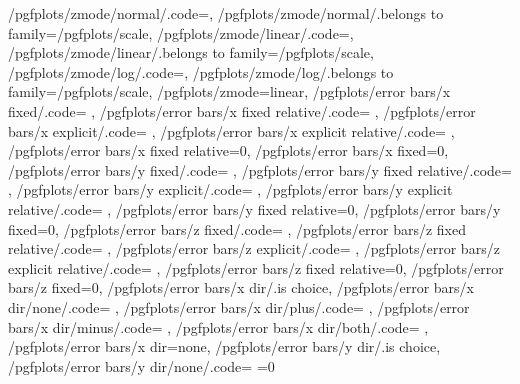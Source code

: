 {	/pgfplots/zmode/normal/.code={\pgfplots@zislineartrue},
	/pgfplots/zmode/normal/.belongs to family=/pgfplots/scale,
	/pgfplots/zmode/linear/.code={\pgfplots@zislineartrue},
	/pgfplots/zmode/linear/.belongs to family=/pgfplots/scale,
	/pgfplots/zmode/log/.code={\pgfplots@zislinearfalse},
	/pgfplots/zmode/log/.belongs to family=/pgfplots/scale,
	/pgfplots/zmode=linear,
	/pgfplots/error bars/x fixed/.code=				\def\pgfplots@errorbars@xfixed{#1}\def\pgfplots@errorbars@xmode{0},
	/pgfplots/error bars/x fixed relative/.code=		\def\pgfplots@errorbars@xrel{#1}\def\pgfplots@errorbars@xmode{1},
	/pgfplots/error bars/x explicit/.code=			\def\pgfplots@errorbars@xmode{2},
	/pgfplots/error bars/x explicit relative/.code=	\def\pgfplots@errorbars@xmode{3},
	/pgfplots/error bars/x fixed relative=0,
	/pgfplots/error bars/x fixed=0,
	/pgfplots/error bars/y fixed/.code=				\def\pgfplots@errorbars@yfixed{#1}\def\pgfplots@errorbars@ymode{0},
	/pgfplots/error bars/y fixed relative/.code=		\def\pgfplots@errorbars@yrel{#1}\def\pgfplots@errorbars@ymode{1},
	/pgfplots/error bars/y explicit/.code=			\def\pgfplots@errorbars@ymode{2},
	/pgfplots/error bars/y explicit relative/.code=	\def\pgfplots@errorbars@ymode{3},
	/pgfplots/error bars/y fixed relative=0,
	/pgfplots/error bars/y fixed=0,
	/pgfplots/error bars/z fixed/.code=				\def\pgfplots@errorbars@zfixed{#1}\def\pgfplots@errorbars@zmode{0},
	/pgfplots/error bars/z fixed relative/.code=		\def\pgfplots@errorbars@zrel{#1}\def\pgfplots@errorbars@zmode{1},
	/pgfplots/error bars/z explicit/.code=			\def\pgfplots@errorbars@zmode{2},
	/pgfplots/error bars/z explicit relative/.code=	\def\pgfplots@errorbars@zmode{3},
	/pgfplots/error bars/z fixed relative=0,
	/pgfplots/error bars/z fixed=0,
	/pgfplots/error bars/x dir/.is choice,
	/pgfplots/error bars/x dir/none/.code={%
		\def\pgfplots@errorbars@xdirection{0}%
		\ifnum{}
			\ifnum{}
				\pgfplots@errorbars@enabledfalse
			\fi
		\fi
	},
	/pgfplots/error bars/x dir/plus/.code=				\def\pgfplots@errorbars@xdirection{1}\pgfplots@errorbars@enabledtrue,
	/pgfplots/error bars/x dir/minus/.code=				\def\pgfplots@errorbars@xdirection{2}\pgfplots@errorbars@enabledtrue,
	/pgfplots/error bars/x dir/both/.code=				\def\pgfplots@errorbars@xdirection{3}\pgfplots@errorbars@enabledtrue,
	/pgfplots/error bars/x dir=none,
	/pgfplots/error bars/y dir/.is choice,
	/pgfplots/error bars/y dir/none/.code={%
		\def\pgfplots@errorbars@ydirection{0}%
		\ifnum\pgfplots@errorbars@xdirection=0
			\ifnum{}
				\pgfplots@errorbars@enabledfalse
}}
